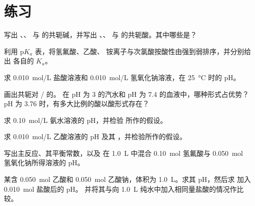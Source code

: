 \section{练习}

\begin{exercise}[$\star$]\label{exo:b1:predominant-reaction:1}
写出 、、 与
 的共轭碱，并写出 、、 与
 的共轭酸。其中哪些是？
\end{exercise}

\begin{exercise}[$\star$]\label{exo:b1:predominant-reaction:2}
利用 $\mathrm{p}K_a$ 表，将氢氟酸、乙酸、
铵离子与次氯酸按酸性由强到弱排序，并分别给出
各自的 $K_a$。
\end{exercise}

\begin{exercise}[$\star$]\label{exo:b1:predominant-reaction:3}
求 \qty{0.010}{mol/L} 盐酸溶液和
\qty{0.010}{mol/L} 氢氧化钠溶液，在
\qty{25}{\celsius} 时的 pH。
\end{exercise}

\begin{exercise}[$\star$]\label{exo:b1:predominant-reaction:4}
画出共轭对 / 的。
在 pH 为 3 的汽水和 pH 为 7.4 的血液中，哪种形式占优势？
pH 为 3.76 时，有多大比例的酸以酸形式存在？
\end{exercise}

\begin{exercise}[$\star\star$]\label{exo:b1:predominant-reaction:5}
求 \qty{0.10}{mol/L} 氨水溶液的 pH，并检验
所作的假设。
\end{exercise}

\begin{exercise}[$\star\star$]\label{exo:b1:predominant-reaction:6}
求 \qty{0.010}{mol/L} 乙酸溶液的 pH 及其
，并检验所作的假设。
\end{exercise}

\begin{exercise}[$\star\star$]\label{exo:b1:predominant-reaction:7}
写出主反应、其平衡常数，以及
在 \qty{1.0}{L} 中混合 \qty{0.10}{mol} 氢氟酸与
\qty{0.050}{mol} 氢氧化钠所得溶液的 pH。
\end{exercise}

\begin{exercise}[$\star\star$]\label{exo:b1:predominant-reaction:8}
某含 \qty{0.050}{mol} 乙酸和 \qty{0.050}{mol}
乙酸钠，体积为 \qty{1.0}{L}。求其 pH，然后求
加入 \qty{0.010}{mol} 盐酸后的 pH。
并将其与向 \qty{1.0}{L} 纯水中加入相同量盐酸的情况作比较。
\end{exercise}

